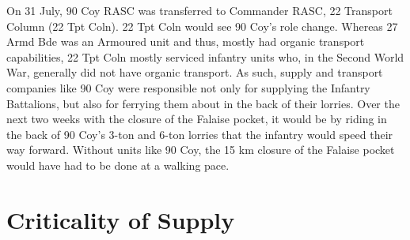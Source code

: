 \documentclass[noraggedright]{turabian-researchpaper}
\begin{document}
On 31 July, 90 Coy RASC was transferred to Commander RASC, 22 Transport Column
(22 Tpt Coln).  22 Tpt Coln would see 90 Coy's role change.  Whereas 27 Armd
Bde was an Armoured unit and thus, mostly had organic transport capabilities,
22 Tpt Coln mostly serviced infantry units who, in the Second World War, 
generally did not have organic transport.  %
As such, supply and transport companies like 90 Coy were responsible not only 
for supplying the Infantry Battalions, but also for ferrying them about in 
the back of their lorries.  Over the next two weeks with the closure of the 
Falaise pocket, it would be by riding in the back of 90 Coy's 3-ton and 6-ton 
lorries that the infantry would speed their way forward.\autocite[See entires
from 11 August the end of the month.  90 Coy `embussed' and `debussed' a
variety of units moving from the final stop lines of Goodwood ever closer to
Falaise]{90wd}
Without units like 
90 Coy, the 15 km closure of the Falaise pocket would have had to be done at 
a walking pace.

\section{} %


\section{Criticality of Supply}




\end{document}
